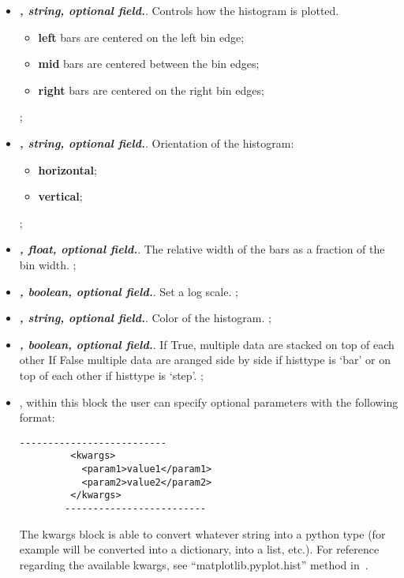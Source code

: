 \begin{itemize}
\begin{itemize}
         \end{itemize}
  ;
  \item {}\textbf{\textit{, string, optional field.}}.
  Controls how the histogram is plotted.
         \begin{itemize}
    \item \textbf{left} bars are centered on the left bin edge;
    \item \textbf{mid} bars are centered between the bin edges;
    \item \textbf{right} bars are centered on the right bin edges;
         \end{itemize}
  ;
  \item {}\textbf{\textit{, string, optional field.}}.
  Orientation of the histogram:
         \begin{itemize}
    \item \textbf{horizontal};
    \item \textbf{vertical};
         \end{itemize}
  ;
  \item {}\textbf{\textit{, float, optional field.}}.
  The relative width of the bars as a fraction of the bin width.
  ;
  \item {}\textbf{\textit{, boolean, optional field.}}.
  Set a log scale.
  ;
  \item {}\textbf{\textit{, string, optional field.}}.
  Color of the histogram.
  ;
  \item {}\textbf{\textit{, boolean, optional field.}}.
  If True, multiple data are stacked on top of each other If False multiple data
  are aranged side by side if histtype is ‘bar’ or on top of each other if
  histtype is ‘step’.
  ;
  \item \textit{}, within this block the user can specify optional
  parameters with the following format:
        \begin{lstlisting}[style=XML]
        --------------------------
         <kwargs>
           <param1>value1</param1>
           <param2>value2</param2>
         </kwargs>
        -------------------------
       \end{lstlisting}
  The kwargs block is able to convert whatever string into a python type (for
  example  will be converted into a
  dictionary,  into a list, etc.).
  For reference regarding the available kwargs, see ``matplotlib.pyplot.hist''
  method in~\cite{MatPlotLib}.
    \end{itemize}

